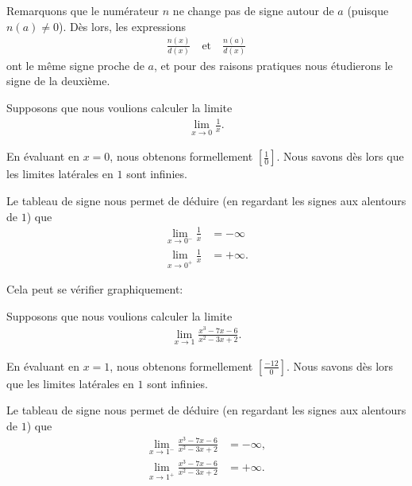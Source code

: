 \documentclass[main.tex]{subfiles}
\begin{document}
Remarquons que le numérateur $n$ ne change pas de signe autour de $a$ (puisque $n(a) \neq 0$).
Dès lors,
les expressions
\begin{align}
    \frac {n(x)} {d(x)}
    \quad \text{et} \quad
    \frac {n(a)} {d(x)}
\end{align}
ont le même signe proche de $a$,
et pour des raisons pratiques nous étudierons le signe de la deuxième.

\begin{example}

    Supposons que nous voulions calculer la limite
    \begin{align}
        \lim_{x \to 0} \frac 1 x.
    \end{align}

    En évaluant en $x = 0$,
    nous obtenons formellement $\left[\frac {1} {0}\right]$.
    Nous savons dès lors que les limites latérales en $1$ sont infinies.

    Le tableau de signe
    nous permet de déduire (en regardant les signes aux alentours de $1$) que
    \begin{align}
        \lim_{x \to 0^-} \frac 1 x &= -\infty\\
        \lim_{x \to 0^+} \frac 1 x &= +\infty.
    \end{align}

    Cela peut se vérifier graphiquement:
    \begin{center}
        \begin{plot}{0.25}{-12}{-12}{12}{12}
        \end{plot}
    \end{center}
\end{example}

\begin{example}

    Supposons que nous voulions calculer la limite
    \begin{align}
        \lim_{x \to 1} \frac {x^3 - 7x - 6} {x^2 - 3x + 2}.
    \end{align}

    En évaluant en $x = 1$,
    nous obtenons formellement $\left[\frac {-12} {0}\right]$.
    Nous savons dès lors que les limites latérales en $1$ sont infinies.

    Le tableau de signe
    nous permet de déduire (en regardant les signes aux alentours de $1$) que
    \begin{align}
        \lim_{x \to 1^-} \frac {x^3 - 7x - 6} {x^2 - 3x + 2} &= -\infty,\\
        \lim_{x \to 1^+} \frac {x^3 - 7x - 6} {x^2 - 3x + 2} &= +\infty.
    \end{align}
\end{example}
\end{document}
